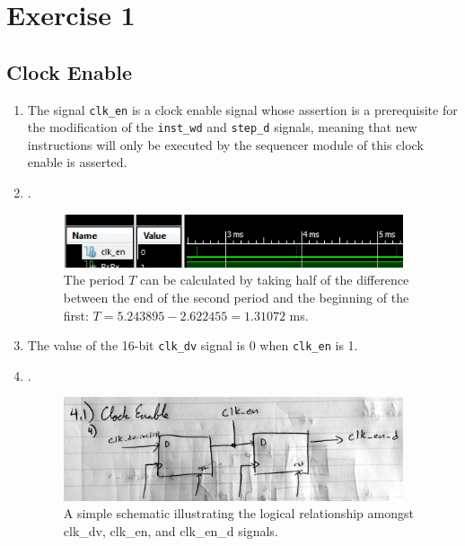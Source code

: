 \documentclass[]{article}
\begin{document}
\section{Exercise 1}

\subsection{Clock Enable}
\begin{enumerate}
\item The signal \texttt{clk\_en} is a clock enable signal whose assertion is a prerequisite for the modification of the \texttt{inst\_wd} and \texttt{step\_d} signals, meaning that new instructions will only be executed by the sequencer module of this clock enable is asserted.
\item . %
\begin{figure}[h]
\centering
\includegraphics[width=10cm]{clk_en.PNG}
\caption{The period $T$ can be calculated by taking half of the difference between the end of the second period and the beginning of the first: $T = 5.243895 - 2.622455 = 1.31072\texttt{}$ ms.}
\end{figure}
\item The value of the 16-bit \texttt{clk\_dv} signal is 0 when \texttt{clk\_en} is 1.
\item . %
\begin{figure}[h]
\centering
\includegraphics[width=10cm]{clk_en.jpg}
\caption{A simple schematic illustrating the logical relationship amongst clk\_dv, clk\_en, and clk\_en\_d signals.}
\end{figure}
\end{enumerate}
\end{document}
